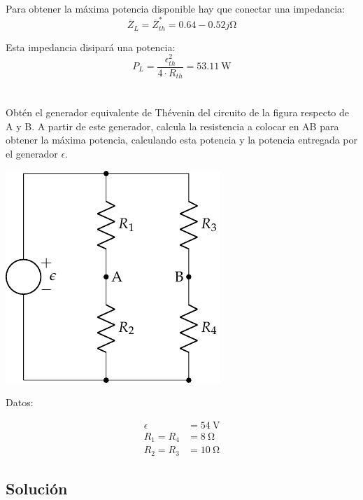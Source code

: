 \documentclass[12pt]{article}
\begin{document}
Para obtener la máxima potencia disponible hay que conectar una impedancia:
\begin{equation*}
\overline{Z}_L = \overline{Z}^*_{th} = 0.64-0.52j\si{\ohm}
\end{equation*}

Esta impedancia disipará una potencia:
\begin{equation*}
P_L = \frac{\epsilon_{th}^2}{4 \cdot R_{th}} = \SI{53.11}{\watt}
\end{equation*}

\clearpage

\section{}

Obtén el generador equivalente de Thévenin del circuito de la figura respecto de A y B. A partir de este generador, calcula la resistencia a colocar en AB para obtener la máxima potencia, calculando esta potencia y la potencia entregada por el generador $\epsilon$.

\begin{center}
\includegraphics{../figs/Thevenin2}
\end{center}

Datos:

\begin{align*}
  \epsilon &= \SI{54}{\volt}\\
  R_1 = R_4 &= \SI{8}{\ohm}\\
  R_2 = R_3 &= \SI{10}{\ohm}
\end{align*}

\noindent\hrulefill

\subsection*{Solución}
\end{document}
